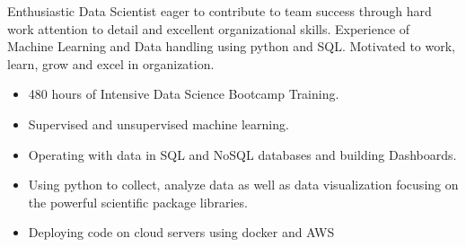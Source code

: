 \documentclass[10pt,a4paper,ragged2e,withhyper]{altacv}
\begin{document}
\begin{paracol}{2}

\begin{flushleft}
Enthusiastic Data Scientist eager to contribute to team success through hard work attention to detail and excellent organizational skills. Experience of Machine Learning and Data handling using python and SQL. Motivated to work, learn, grow and excel in organization.
\end{flushleft}
\begin{comment}
\cvevent{President \& CEO}{Yahoo!}{July 2012 -- Ongoing}{Sunnyvale, CA}
\begin{itemize}
\item Led the \$5 billion acquisition of the company with Verizon -- the entity which believed most in the immense value Yahoo!\ has created
\item Acquired Tumblr for \$1.1 billion and moved the company's blog there
\item Built Yahoo's mobile, video and social businesses from nothing in 2011 to \$1.6 billion in GAAP revenue in 2015
\item Tripled the company's mobile base to over 600 million monthly active users and generated over \$1 billion of mobile advertising revenue last year
\end{itemize}
\end{comment}

\divider
{}
\begin{itemize}
\item 480 hours of Intensive Data Science Bootcamp Training.
\item Supervised and unsupervised machine learning.
\item Operating with data in SQL and NoSQL databases and building Dashboards.
\item Using python to collect, analyze data as well as data visualization focusing on the powerful scientific package libraries.
\item Deploying code on cloud servers using docker and AWS
\end{itemize}

\divider
{}
\begin{itemize}


\end{itemize}
\end{paracol}
\end{document}
